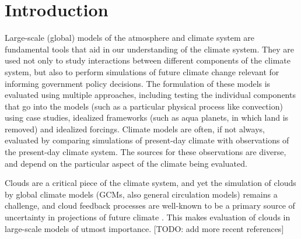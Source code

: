 \chapter{Introduction}\label{sec:introductionChapter}

Large-scale (global) models of the atmosphere and climate system are
fundamental tools that aid in our understanding of the climate system.
They are used not only to study interactions between different
components of the climate system, but also to perform simulations of
future climate change relevant for informing government policy
decisions. The formulation of these models is evaluated using multiple
approaches, including testing the individual components that go into the
models (such as a particular physical process like convection) using
case studies, idealized frameworks (such as aqua planets, in which land
is removed) and idealized forcings. Climate models are often, if not
always, evaluated by comparing simulations of present-day climate with
observations of the present-day climate system. The sources for these
observations are diverse, and depend on the particular aspect of the
climate being evaluated.

Clouds are a critical piece of the climate system, and yet the
simulation of clouds by global climate models (GCMs, also general
circulation models) remains a challenge, and cloud feedback processes
are well-known to be a primary source of uncertainty in projections of
future climate
\citep{cess_et_al_1990, bony_and_dufresne_2005, williams_and_webb_2009, medeiros_et_al_2008, dufresne_and_bony_2008, bony_et_al_2006}.
This makes evaluation of clouds in large-scale models of utmost
importance. {[}TODO: add more recent references{]}


